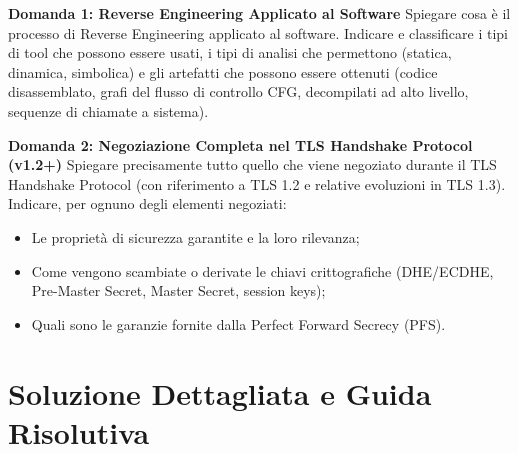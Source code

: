 \documentclass[11pt,a4paper]{article}
\begin{document}
\begin{questionbox}
\textbf{Domanda 1: Reverse Engineering Applicato al Software}
Spiegare cosa \`e il processo di Reverse Engineering applicato al software.
Indicare e classificare i tipi di tool che possono essere usati, i tipi di analisi che permettono (statica, dinamica, simbolica) e gli artefatti che possono essere ottenuti (codice disassemblato, grafi del flusso di controllo CFG, decompilati ad alto livello, sequenze di chiamate a sistema).

\textbf{Domanda 2: Negoziazione Completa nel TLS Handshake Protocol (v1.2+)}
Spiegare precisamente tutto quello che viene negoziato durante il TLS Handshake Protocol (con riferimento a TLS 1.2 e relative evoluzioni in TLS 1.3).
Indicare, per ognuno degli elementi negoziati:
\begin{itemize}
    \item Le propriet\`a di sicurezza garantite e la loro rilevanza;
    \item Come vengono scambiate o derivate le chiavi crittografiche (DHE/ECDHE, Pre-Master Secret, Master Secret, session keys);
    \item Quali sono le garanzie fornite dalla Perfect Forward Secrecy (PFS).
\end{itemize}
\end{questionbox}

\newpage
\section{Soluzione Dettagliata e Guida Risolutiva}
\end{document}
